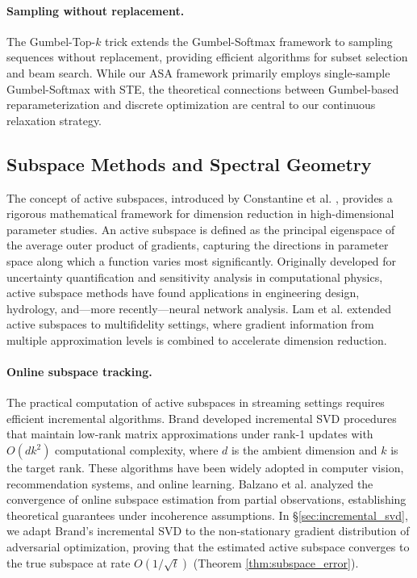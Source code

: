 ﻿\documentclass[lettersize,journal]{IEEEtran}
\begin{document}
\paragraph{Sampling without replacement.} The Gumbel-Top-$k$ trick \cite{kool2019stochastic} extends the Gumbel-Softmax framework to sampling sequences without replacement, providing efficient algorithms for subset selection and beam search. While our ASA framework primarily employs single-sample Gumbel-Softmax with STE, the theoretical connections between Gumbel-based reparameterization and discrete optimization are central to our continuous relaxation strategy.

\subsection{Subspace Methods and Spectral Geometry}
\label{sec:rw_subspace}

The concept of active subspaces, introduced by Constantine et al. \cite{constantine2014active, constantine2015active}, provides a rigorous mathematical framework for dimension reduction in high-dimensional parameter studies. An active subspace is defined as the principal eigenspace of the average outer product of gradients, capturing the directions in parameter space along which a function varies most significantly. Originally developed for uncertainty quantification and sensitivity analysis in computational physics, active subspace methods have found applications in engineering design, hydrology, and---more recently---neural network analysis. Lam et al. \cite{lam2022multifidelity} extended active subspaces to multifidelity settings, where gradient information from multiple approximation levels is combined to accelerate dimension reduction.

\paragraph{Online subspace tracking.} The practical computation of active subspaces in streaming settings requires efficient incremental algorithms. Brand \cite{brand2002incremental, brand2006fast} developed incremental SVD procedures that maintain low-rank matrix approximations under rank-1 updates with $O(dk^2)$ computational complexity, where $d$ is the ambient dimension and $k$ is the target rank. These algorithms have been widely adopted in computer vision, recommendation systems, and online learning. Balzano et al. \cite{balzano2018online} analyzed the convergence of online subspace estimation from partial observations, establishing theoretical guarantees under incoherence assumptions. In \S\ref{sec:incremental_svd}, we adapt Brand's incremental SVD to the non-stationary gradient distribution of adversarial optimization, proving that the estimated active subspace converges to the true subspace at rate $O(1/\sqrt{t})$ (Theorem \ref{thm:subspace_error}).
\end{document}
